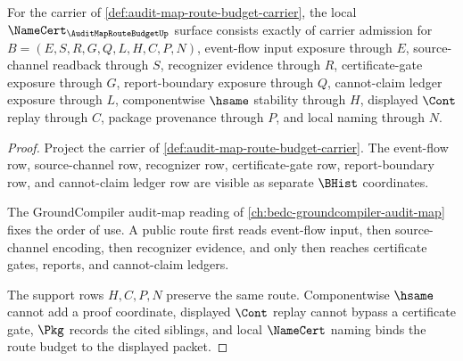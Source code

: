 \begin{theorem}
\label{thm:audit-map-route-budget-namecert-obligations}
For the carrier of \autoref{def:audit-map-route-budget-carrier}, the local $\NameCert_{\AuditMapRouteBudgetUp}$ surface consists exactly of carrier admission for $B=(E,S,R,G,Q,L,H,C,P,N)$, event-flow input exposure through $E$, source-channel readback through $S$, recognizer evidence through $R$, certificate-gate exposure through $G$, report-boundary exposure through $Q$, cannot-claim ledger exposure through $L$, componentwise $\hsame$ stability through $H$, displayed $\Cont$ replay through $C$, package provenance through $P$, and local naming through $N$.
\end{theorem}
\begin{proof}
Project the carrier of \autoref{def:audit-map-route-budget-carrier}. The event-flow row, source-channel row, recognizer row, certificate-gate row, report-boundary row, and cannot-claim ledger row are visible as separate $\BHist$ coordinates.

The GroundCompiler audit-map reading of \autoref{ch:bedc-groundcompiler-audit-map} fixes the order of use. A public route first reads event-flow input, then source-channel encoding, then recognizer evidence, and only then reaches certificate gates, reports, and cannot-claim ledgers.

The support rows $H,C,P,N$ preserve the same route. Componentwise $\hsame$ cannot add a proof coordinate, displayed $\Cont$ replay cannot bypass a certificate gate, $\Pkg$ records the cited siblings, and local $\NameCert$ naming binds the route budget to the displayed packet.
\end{proof}

